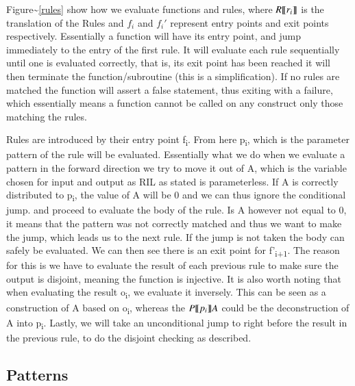 \documentclass[a4paper]{article}
\begin{document}
Figure\textasciitilde{}\ref{rules} show how we evaluate functions and rules, where \(R \llbracket r_i \rrbracket\) is the translation of the Rules and \(f_i\) and  \(f_i'\) represent entry points and exit points respectively. Essentially a function will have its entry point, and jump immediately to the entry of the first rule. It will evaluate each rule sequentially until one is evaluated correctly, that is, its exit point has been reached it will then terminate the function/subroutine (this is a simplification). If no rules are matched the function will assert a false statement, thus exiting with a failure, which essentially means a function cannot be called on any construct only those matching the rules.

Rules are introduced by their entry point f\textsubscript{i}. From here p\textsubscript{i}, which is the parameter pattern of the rule will be evaluated. Essentially what we do when we evaluate a pattern in the forward direction we try to move it out of A, which is the variable chosen for input and output as RIL as stated is parameterless. If A is correctly distributed to p\textsubscript{i}, the value of A will be 0 and we can thus ignore the conditional jump. and proceed to evaluate the body of the rule. Is A however not equal to 0, it means that the pattern was not correctly matched and thus we want to make the jump, which leads us to the next rule. If the jump is not taken the body can safely be evaluated. We can then see there is an exit point for f'\textsubscript{i+1}. The reason for this is we have to evaluate the result of each previous rule to make sure the output is disjoint, meaning the function is injective. It is also worth noting that when evaluating the result o\textsubscript{i}, we evaluate it inversely. This can be seen as a construction of A based on o\textsubscript{i}, whereas the \(P\llbracket p_i \rrbracket A\) could be the deconstruction of A into p\textsubscript{i}. Lastly, we will take an unconditional jump to right before the result in the previous rule, to do the disjoint checking as described.

\subsection{Patterns}
\label{sec:org62f0b75}
\end{document}
